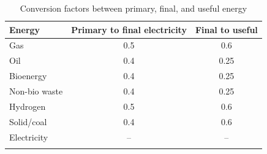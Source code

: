\begin{longtable}{lcc}
\caption{Conversion factors between primary, final, and useful energy} \\ 
  \hline
Energy & Primary to final electricity & Final to useful \\ 
  \hline
Gas & 0.5 & 0.6 \\ 
  Oil & 0.4 & 0.25 \\ 
  Bioenergy & 0.4 & 0.25 \\ 
  Non-bio waste & 0.4 & 0.25 \\ 
  Hydrogen & 0.5 & 0.6 \\ 
  Solid/coal & 0.4 & 0.6 \\ 
  Electricity & -- & -- \\ 
   \hline
\hline
\label{tab_conversion_factor_energy}
\end{longtable}
